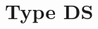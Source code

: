 \documentclass[a4paper, 11pt,reqno]{article}
\begin{document}

















\section*{Type DS}
\end{document}
